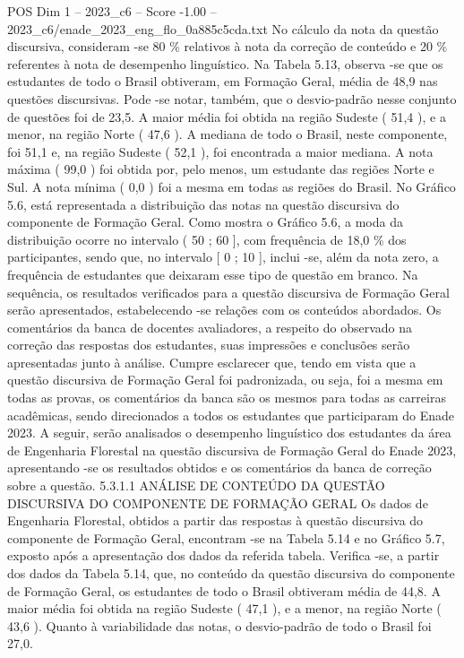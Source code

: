 \begin{textsample}{POS Dim 1 – 2023\_c6 – Score -1.00 – 2023\_c6/enade\_2023\_eng\_flo\_0a885c5cda.txt}
No cálculo da nota da questão discursiva, consideram -se 80 \% relativos à nota da correção de conteúdo e 20 \% referentes à nota de desempenho linguístico.
Na Tabela 5.13, observa -se que os estudantes de todo o Brasil obtiveram, em Formação Geral, média de 48,9 nas questões discursivas.
Pode -se notar, também, que o desvio-padrão nesse conjunto de questões foi de 23,5.
A maior média foi obtida na região Sudeste ( 51,4 ), e a menor, na região Norte ( 47,6 ).
A mediana de todo o Brasil, neste componente, foi 51,1 e, na região Sudeste ( 52,1 ), foi encontrada a maior mediana.
A nota máxima ( 99,0 ) foi obtida por, pelo menos, um estudante das regiões Norte e Sul.
A nota mínima ( 0,0 ) foi a mesma em todas as regiões do Brasil.
No Gráfico 5.6, está representada a distribuição das notas na questão discursiva do componente de Formação Geral.
Como mostra o Gráfico 5.6, a moda da distribuição ocorre no intervalo ( 50 ; 60 ], com frequência de 18,0 \% dos participantes, sendo que, no intervalo [ 0 ; 10 ], inclui -se, além da nota zero, a frequência de estudantes que deixaram esse tipo de questão em branco.
Na sequência, os resultados verificados para a questão discursiva de Formação Geral serão apresentados, estabelecendo -se relações com os conteúdos abordados.
Os comentários da banca de docentes avaliadores, a respeito do observado na correção das respostas dos estudantes, suas impressões e conclusões serão apresentadas junto à análise.
Cumpre esclarecer que, tendo em vista que a questão discursiva de Formação Geral foi padronizada, ou seja, foi a mesma em todas as provas, os comentários da banca são os mesmos para todas as carreiras acadêmicas, sendo direcionados a todos os estudantes que participaram do Enade 2023.
A seguir, serão analisados o desempenho linguístico dos estudantes da área de Engenharia Florestal na questão discursiva de Formação Geral do Enade 2023, apresentando -se os resultados obtidos e os comentários da banca de correção sobre a questão. 5.3.1.1 ANÁLISE DE CONTEÚDO DA QUESTÃO DISCURSIVA DO COMPONENTE DE FORMAÇÃO GERAL Os dados de Engenharia Florestal, obtidos a partir das respostas à questão discursiva do componente de Formação Geral, encontram -se na Tabela 5.14 e no Gráfico 5.7, exposto após a apresentação dos dados da referida tabela.
Verifica -se, a partir dos dados da Tabela 5.14, que, no conteúdo da questão discursiva do componente de Formação Geral, os estudantes de todo o Brasil obtiveram média de 44,8.
A maior média foi obtida na região Sudeste ( 47,1 ), e a menor, na região Norte ( 43,6 ).
Quanto à variabilidade das notas, o desvio-padrão de todo o Brasil foi 27,0.

\end{textsample}
